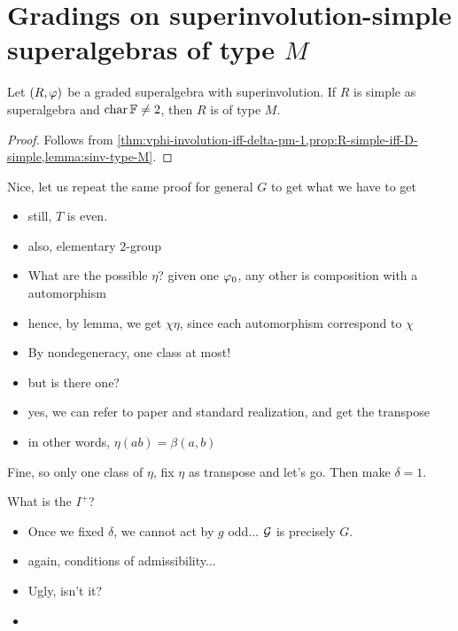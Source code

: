 \section{Gradings on superinvolution-simple superalgebras of type \texorpdfstring{$M$}{M}}

\begin{lemma}\label{lemma:sinv-type-M}
    Let $(R, \varphi)$ be a graded superalgebra with superinvolution. 
    If $R$ is simple as superalgebra and $\operatorname{char} \mathbb{F}\neq 2$, then $R$ is of type $M$.
\end{lemma}

\begin{proof}
    Follows from \cref{thm:vphi-involution-iff-delta-pm-1,prop:R-simple-iff-D-simple,lemma:sinv-type-M}. 
\end{proof}

Nice, let us repeat the same proof for general $G$ to get what we have to get

\begin{itemize}
    \item still, $T$ is even.
    \item also, elementary $2$-group
    \item What are the possible $\eta$? given one $\varphi_0$, any other is composition with a automorphism
    \item hence, by lemma, we get $\chi \eta$, since each automorphism correspond to $\chi$
    \item By nondegeneracy, one class at most!
    \item but is there one?
    \item yes, we can refer to paper and standard realization, and get the transpose
    \item in other words, $\eta(ab) = \beta(a,b)$
\end{itemize}

Fine, so only one class of $\eta$, fix $\eta$ as transpose and let's go. 
Then make $\delta = 1$. 

What is the $I^+$? 

\begin{itemize}
    \item Once we fixed $\delta$, we cannot act by $g$ odd... $\mathcal G$ is precisely $G$.
    \item again, conditions of admissibility...
    \item Ugly, isn't it?
    \item 
\end{itemize}

